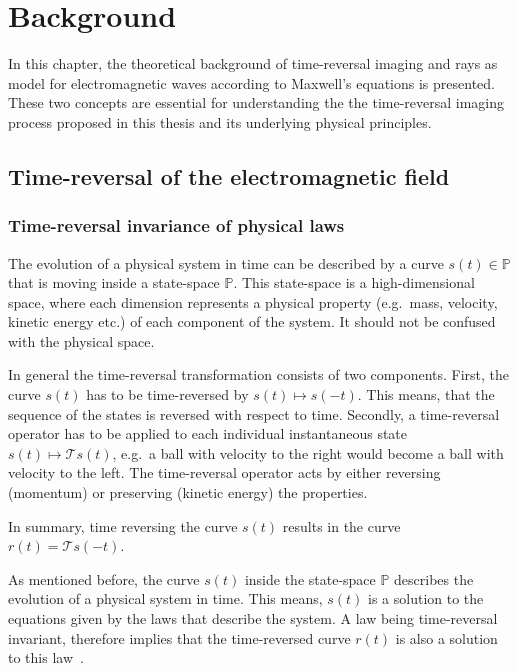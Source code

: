 
\chapter{Background}\label{chapter:background}
In this chapter, the theoretical background of time-reversal imaging and rays as model for electromagnetic waves according to Maxwell's equations is presented.
These two concepts are essential for understanding the the time-reversal imaging process proposed in this thesis and its underlying physical principles. 

\section{Time-reversal of the electromagnetic field}
\subsection{Time-reversal invariance of physical laws}
The evolution of a physical system in time can be described by a curve \(s(t) \in \mathbb{P}\) that is moving inside a state-space \(\mathbb{P}\).
This state-space is a high-dimensional space, where each dimension represents a physical property (e.g.~mass, velocity, kinetic energy etc.) of each component of the system.
It should not be confused with the physical space.

In general the time-reversal transformation consists of two components\parencite{roberts_reversing_2022}.
First, the curve \(s(t)\) has to be time-reversed by \(s(t) \mapsto s(-t)\).
This means, that the sequence of the states is reversed with respect to time.
Secondly, a time-reversal operator has to be applied to each individual instantaneous state \(s(t) \mapsto \mathcal{T}s(t)\), e.g.\ a ball with velocity to the right would become a ball with velocity to the left.
The time-reversal operator acts by either reversing (momentum) or preserving (kinetic energy) the properties.

In summary, time reversing the curve \(s(t)\) results in the curve \(r(t)=\mathcal{T}s(-t)\). 

As mentioned before, the curve \(s(t)\) inside the state-space \(\mathbb{P}\) describes the evolution of a physical system in time.
This means, \(s(t)\) is a solution to the equations given by the laws that describe the system. 
A law being time-reversal invariant, therefore implies that the time-reversed curve \(r(t)\) is also a solution to this law~\parencite{roberts_time_2021}.

